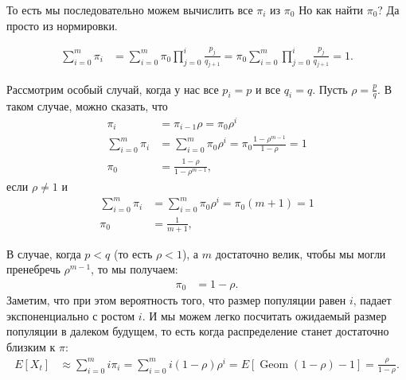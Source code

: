 \documentclass[12pt]{article}
\DeclareMathOperator{\Geom}{Geom}
\begin{document}
То есть мы последовательно можем вычислить все $\pi_i$ из $\pi_0$ Но как найти $\pi_0$? Да просто из нормировки.

\begin{align*}
  \sum_{i = 0}^m \pi_i &= \sum_{i = 0}^m \pi_0 \prod_{j = 0}^i  \frac{p_j}{q_{j + 1}} = \pi_0 \sum_{i = 0}^m \prod_{j = 0}^i  \frac{p_j}{q_{j + 1}} = 1.
\end{align*}

Рассмотрим особый случай, когда у нас все $p_i = p$ и все $q_i = q$. Пусть $\rho = \frac{p}{q}$. В таком случае, можно сказать, что 
\begin{align*}
  \pi_i &= \pi_{i - 1}\rho = \pi_0 \rho^i \\
  \sum_{i = 0}^m \pi_i &= \sum_{i = 0}^m \pi_0 \rho^i = \pi_0 \frac{1 - \rho^{m - 1}}{1 - \rho} = 1 \\
  \pi_0 &= \frac{1 - \rho}{1 - \rho^{m - 1}},
\end{align*}
если $\rho \ne 1$ и
\begin{align*}
  \sum_{i = 0}^m \pi_i &= \sum_{i = 0}^m \pi_0 \rho^i = \pi_0 (m + 1) = 1 \\
  \pi_0 &= \frac{1}{m + 1},
\end{align*}

В случае, когда $p < q$ (то есть $\rho < 1$), а $m$ достаточно велик, чтобы мы могли пренебречь $\rho^{m - 1}$, то мы получаем:
\begin{align*}
  \pi_0 &= 1 - \rho.
\end{align*}
Заметим, что при этом вероятность того, что размер популяции равен $i$, падает экспоненциально с ростом $i$. И мы можем легко посчитать ожидаемый размер популяции в 
далеком будущем, то есть когда распределение станет достаточно близким к $\pi$:
\begin{align*}
  E[X_t] &\approx \sum_{i = 0}^m i \pi_i = \sum_{i = 0}^m i (1 - \rho) \rho^i = E[\Geom(1 - \rho) - 1] = \frac{\rho}{1 - \rho}.
\end{align*}
\end{document}
